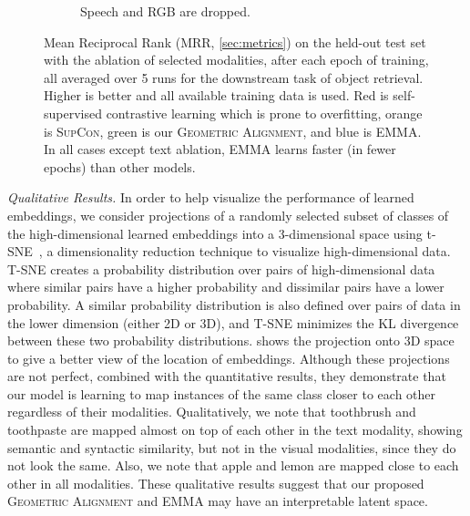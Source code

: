 \documentclass[sigconf,natbib=true,anonymous=true]{acmart}
\newcommand{\ours}{\textsc{EMMA}}
\newcommand{\geom}{\textsc{Geometric Alignment}}
\newcommand{\supcon}{\textsc{SupCon}}
\begin{document}
\begin{figure}
\begin{subfigure}[b]{0.49\columnwidth}
        \caption[]{Speech and RGB are dropped.}    
        \label{fig:epochs-mrr.ld}
    \end{subfigure}
    \caption[]
    {Mean Reciprocal Rank (MRR, \cref{sec:metrics}) on the held-out test set with the ablation of selected modalities, after each epoch of training, all averaged over 5 runs for the downstream task of object retrieval. Higher is better and all available training data is used. Red is self-supervised contrastive learning which is prone to overfitting, orange is \supcon{}, green is our \geom{}, and blue is \ours{}. In all cases except text ablation, \ours{} learns faster (in fewer epochs) than other models.
    } 
    \label{fig:result_graphs}
\end{figure}
%     

\textit{Qualitative Results.}
In order to help visualize the performance of learned embeddings, we consider projections of a randomly selected subset of classes of the high-dimensional learned embeddings into a 3-dimensional space using t-SNE~\citep{van2008tsne}, a dimensionality reduction technique to visualize high-dimensional data. T-SNE creates a probability distribution over pairs of high-dimensional data where similar pairs have a higher probability and dissimilar pairs have a lower probability. A similar probability distribution is also defined over pairs of data in the lower dimension (either 2D or 3D), and T-SNE minimizes the KL divergence between these two probability distributions.
 shows the projection onto 3D space to give a better view of the location of embeddings. Although these projections are not perfect, combined with the quantitative results, they demonstrate that our model is learning to map instances of the same class closer to each other regardless of their modalities. 
Qualitatively, we note that toothbrush and toothpaste are mapped almost on top of each other in the text modality, showing semantic and syntactic similarity, but not in the visual modalities, since they do not look the same. Also, we note that apple and lemon are mapped close to each other in all modalities. These qualitative results suggest that our proposed \geom{} and \ours{} may have an interpretable latent space.
\end{document}
